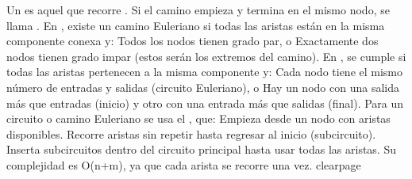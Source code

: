 {}Un  es aquel que recorre .\markdownRendererHardLineBreak
{}Si el camino empieza y termina en el mismo nodo, se llama .\markdownRendererParagraphSeparator
{}En , existe un camino Euleriano si todas las aristas están en la misma componente conexa y:\markdownRendererInterblockSeparator
{}\markdownRendererUlBeginTight
\markdownRendererUlItem Todos los nodos tienen grado par, o\markdownRendererUlItemEnd 
\markdownRendererUlItem Exactamente dos nodos tienen grado impar (estos serán los extremos del camino).\markdownRendererUlItemEnd 
\markdownRendererUlEndTight \markdownRendererInterblockSeparator
{}En , se cumple si todas las aristas pertenecen a la misma componente y:\markdownRendererInterblockSeparator
{}\markdownRendererUlBeginTight
\markdownRendererUlItem Cada nodo tiene el mismo número de entradas y salidas (circuito Euleriano), o\markdownRendererUlItemEnd 
\markdownRendererUlItem Hay un nodo con una salida más que entradas (inicio) y otro con una entrada más que salidas (final).\markdownRendererUlItemEnd 
\markdownRendererUlEndTight \markdownRendererInterblockSeparator
{}Para  un circuito o camino Euleriano se usa el , que:\markdownRendererInterblockSeparator
{}\markdownRendererOlBeginTight
{}Empieza desde un nodo con aristas disponibles.\markdownRendererOlItemEnd 
{}Recorre aristas sin repetir hasta regresar al inicio (subcircuito).\markdownRendererOlItemEnd 
{}Inserta subcircuitos dentro del circuito principal hasta usar todas las aristas.\markdownRendererOlItemEnd 
\markdownRendererOlEndTight \markdownRendererInterblockSeparator
{}Su complejidad es \markdownRendererDollarSign{}O(n+m)\markdownRendererDollarSign{}, ya que cada arista se recorre una vez.\markdownRendererParagraphSeparator
{}\markdownRendererDollarSign{}\markdownRendererBackslash{}clearpage\markdownRendererDollarSign{}\markdownRendererInterblockSeparator
{}\markdownRendererInterblockSeparator
{}
\markdownRendererSectionEnd \markdownRendererSectionBegin
{}\markdownRendererInterblockSeparator
